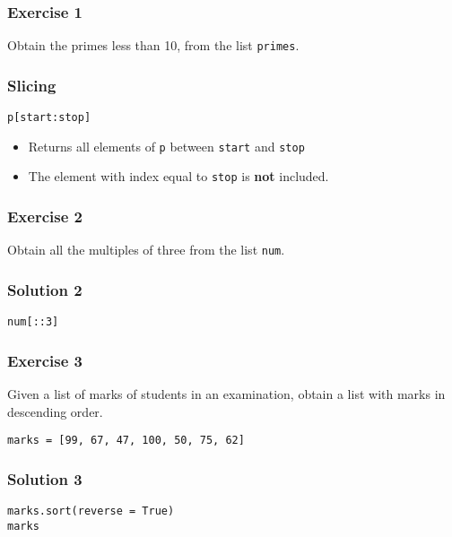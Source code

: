 \documentclass[17pt,compress]{beamer}
\begin{document}
\begin{frame}
\frametitle{Exercise 1}
\label{sec-4}

  Obtain the primes less than 10, from the list  \texttt{primes}. 
\end{frame}
\begin{frame}[fragile]
\frametitle{Slicing}
\label{sec-5}

\lstset{language=Python}
\begin{lstlisting}
p[start:stop]
\end{lstlisting}\pause

\begin{itemize}
\item Returns all elements of \texttt{p} between \texttt{start} and \texttt{stop}\pause
\item The element with index equal to \texttt{stop} is \textbf{not} included.
\end{itemize}
\end{frame}
\begin{frame}
\frametitle{Exercise 2}
\label{sec-6}

  Obtain all the multiples of three from the list \texttt{num}.
\end{frame}
\begin{frame}[fragile]
\frametitle{Solution 2}
\label{sec-7}

\lstset{language=Python}
\begin{lstlisting}
num[::3]
\end{lstlisting}
\end{frame}
\begin{frame}[fragile]
\frametitle{Exercise 3}
\label{sec-8}

  Given a list of marks of students in an examination, obtain a list
  with marks in descending order.
\lstset{language=Python}
\begin{small}
\begin{lstlisting}
marks = [99, 67, 47, 100, 50, 75, 62]
\end{lstlisting}
\end{small}
\end{frame}
\begin{frame}[fragile]
\frametitle{Solution 3}
\label{sec-7}

\lstset{language=Python}
\begin{lstlisting}
marks.sort(reverse = True)
marks
\end{lstlisting}
\end{frame}
\end{document}
